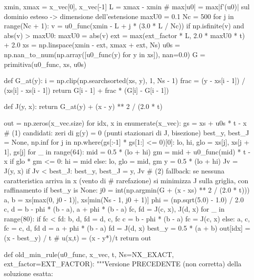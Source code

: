 \documentclass[12pt]{article}
\begin{document}
\begin{pythoncode}[title=Implementazione WENO]
    xmin, xmax = x_vec[0], x_vec[-1]
    L = xmax - xmin
    # max|u0| = max|f'(u0)| sul dominio esteso -> dimensione dell'estensione
    maxU0 = 0.1
    Nc = 500
    for j in range(Nc + 1):
        v = u0_func(xmin - L + j * (3.0 * L / Nc))
        if np.isfinite(v) and abs(v) > maxU0:
            maxU0 = abs(v)
    ext = max(ext_factor * L, 2.0 * maxU0 * t) + 2.0
    xs = np.linspace(xmin - ext, xmax + ext, Ns)
    u0s = np.nan_to_num(np.array([u0_func(y) for y in xs]), nan=0.0)
    G = primitiva(u0_func, xs, u0s)

    def G_at(y):
        i = np.clip(np.searchsorted(xs, y), 1, Ns - 1)
        frac = (y - xs[i - 1]) / (xs[i] - xs[i - 1])
        return G[i - 1] + frac * (G[i] - G[i - 1])

    def J(y, x):
        return G_at(y) + (x - y) ** 2 / (2.0 * t)

    out = np.zeros(x_vec.size)
    for idx, x in enumerate(x_vec):
        gs = xs + u0s * t - x
        # (1) candidati: zeri di g(y) = 0 (punti stazionari di J, bisezione)
        best_y, best_J = None, np.inf
        for j in np.where(gs[:-1] * gs[1:] <= 0)[0]:
            lo, hi, glo = xs[j], xs[j + 1], gs[j]
            for _ in range(64):
                mid = 0.5 * (lo + hi)
                gm = mid + u0_func(mid) * t - x
                if glo * gm <= 0:
                    hi = mid
                else:
                    lo, glo = mid, gm
            y = 0.5 * (lo + hi)
            Jv = J(y, x)
            if Jv < best_J:
                best_y, best_J = y, Jv
        # (2) fallback: se nessuna caratteristica arriva in x (vento di
        #     rarefazione) si minimizza J sulla griglia, con raffinamento
        if best_y is None:
            j0 = int(np.argmin(G + (x - xs) ** 2 / (2.0 * t)))
            a, b = xs[max(0, j0 - 1)], xs[min(Ns - 1, j0 + 1)]
            phi = (np.sqrt(5.0) - 1.0) / 2.0
            c, d = b - phi * (b - a), a + phi * (b - a)
            fc, fd = J(c, x), J(d, x)
            for _ in range(80):
                if fc < fd:
                    b, d, fd = d, c, fc
                    c = b - phi * (b - a)
                    fc = J(c, x)
                else:
                    a, c, fc = c, d, fd
                    d = a + phi * (b - a)
                    fd = J(d, x)
            best_y = 0.5 * (a + b)
        out[idx] = (x - best_y) / t                  # u(x,t) = (x - y*)/t
    return out


def old_min_rule(u0_func, x_vec, t, Ns=NX_EXACT, ext_factor=EXT_FACTOR):
    """Versione PRECEDENTE (non corretta) della soluzione esatta:


\end{pythoncode}
\end{document}
